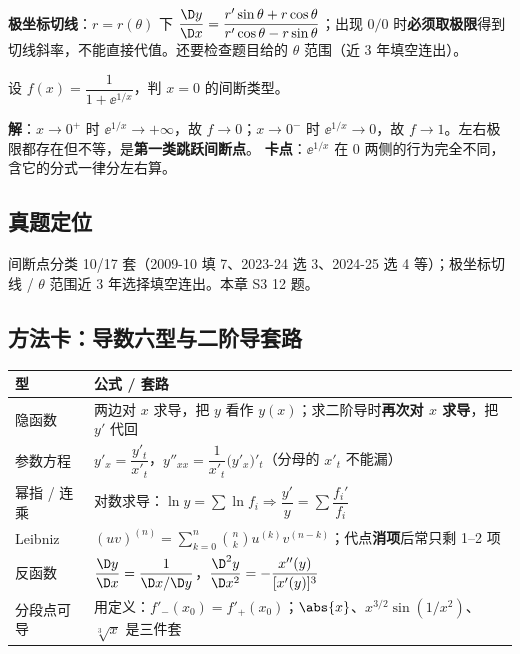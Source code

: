\noindent\textbf{极坐标切线}：$r=r(\theta)$ 下 $\dfrac{\D y}{\D x}=\dfrac{r'\sin\theta+r\cos\theta}{r'\cos\theta-r\sin\theta}$；出现 $0/0$ 时\textbf{必须取极限}得到切线斜率，不能直接代值。还要检查题目给的 $\theta$ 范围（近 3 年填空连出）。

\begin{keypoint}
设 $f(x)=\dfrac{1}{1+\ee^{1/x}}$，判 $x=0$ 的间断类型。

\noindent\textbf{解}：$x\to0^+$ 时 $\ee^{1/x}\to+\infty$，故 $f\to0$；$x\to0^-$ 时 $\ee^{1/x}\to0$，故 $f\to1$。左右极限都存在但不等，是\textbf{第一类跳跃间断点}。
\textbf{卡点}：$\ee^{1/x}$ 在 $0$ 两侧的行为完全不同，含它的分式一律分左右算。
\end{keypoint}

\subsection{真题定位}
间断点分类 10/17 套（2009-10 填 7、2023-24 选 3、2024-25 选 4 等）；极坐标切线 / $\theta$ 范围近 3 年选择填空连出。本章 S3 12 题。

\subsection{方法卡：导数六型与二阶导套路}

\begin{center}
\begin{tabular}{@{}p{3.2cm}p{11.9cm}@{}}
\toprule
\textbf{型} & \textbf{公式 / 套路} \\
\midrule
隐函数 & 两边对 $x$ 求导，把 $y$ 看作 $y(x)$；求二阶导时\textbf{再次对 $x$ 求导}，把 $y'$ 代回 \\
参数方程 & $y'_x=\dfrac{y'_t}{x'_t}$，$y''_{xx}=\dfrac{1}{x'_t}\big(y'_x\big)'_t$（分母的 $x'_t$ 不能漏） \\
幂指 / 连乘 & 对数求导：$\ln y=\sum\ln f_i\Rightarrow \dfrac{y'}{y}=\sum\dfrac{f_i'}{f_i}$ \\
Leibniz & $(uv)^{(n)}=\sum_{k=0}^{n}\binom{n}{k}u^{(k)}v^{(n-k)}$；代点\textbf{消项}后常只剩 1--2 项 \\
反函数 & $\dfrac{\D y}{\D x}=\dfrac{1}{\D x/\D y}$，$\dfrac{\D^2 y}{\D x^2}=-\dfrac{x''(y)}{[x'(y)]^{3}}$ \\
分段点可导 & 用定义：$f'_-(x_0)=f'_+(x_0)$；$\abs{x}$、$x^{3/2}\sin(1/x^2)$、$\sqrt[3]{x}$ 是三件套 \\
\bottomrule
\end{tabular}
\end{center}

